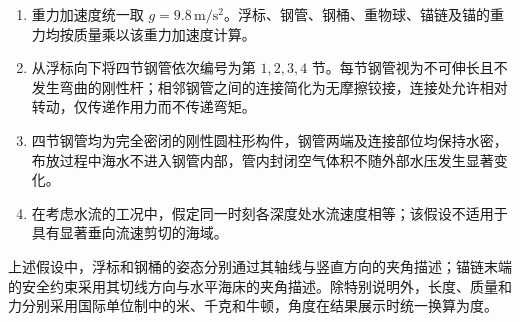\begin{enumerate}[label=\arabic*., leftmargin=2.8em]
  \item 重力加速度统一取 \(g=9.8\,\mathrm{m/s^2}\)。浮标、钢管、钢桶、重物球、锚链及锚的重力均按质量乘以该重力加速度计算。

  \item 从浮标向下将四节钢管依次编号为第 \(1,2,3,4\) 节。每节钢管视为不可伸长且不发生弯曲的刚性杆；相邻钢管之间的连接简化为无摩擦铰接，连接处允许相对转动，仅传递作用力而不传递弯矩。

  \item 四节钢管均为完全密闭的刚性圆柱形构件，钢管两端及连接部位均保持水密，布放过程中海水不进入钢管内部，管内封闭空气体积不随外部水压发生显著变化。

  \item 在考虑水流的工况中，假定同一时刻各深度处水流速度相等；该假设不适用于具有显著垂向流速剪切的海域。
\end{enumerate}

上述假设中，浮标和钢桶的姿态分别通过其轴线与竖直方向的夹角描述；锚链末端的安全约束采用其切线方向与水平海床的夹角描述。除特别说明外，长度、质量和力分别采用国际单位制中的米、千克和牛顿，角度在结果展示时统一换算为度。
